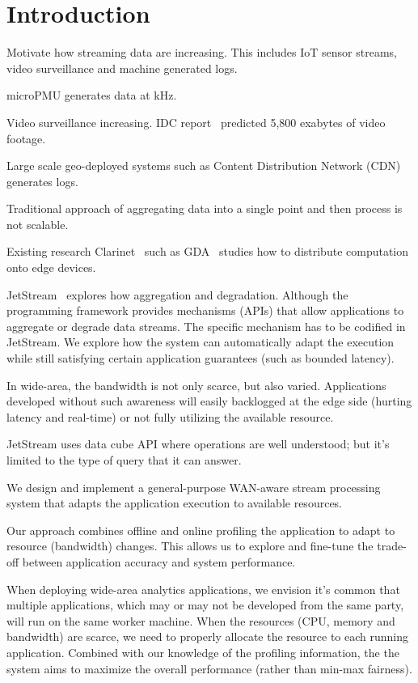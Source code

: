 \section{Introduction}
\label{sec:introduction}

Motivate how streaming data are increasing. This includes IoT sensor streams,
video surveillance and machine generated logs.

microPMU generates data at kHz.

Video surveillance increasing. IDC report~\cite{gantz2012digital} predicted
5,800 exabytes of video footage.

Large scale geo-deployed systems such as Content Distribution Network (CDN)
generates logs.

Traditional approach of aggregating data into a single point and then process is
not scalable.

Existing research Clarinet~\cite{viswanathan2016clarinet} such as
GDA~\cite{pu2015low} studies how to distribute computation onto edge devices.

JetStream~\cite{rabkin2014aggregation} explores how aggregation and degradation.
Although the programming framework provides mechanisms (APIs) that allow
applications to aggregate or degrade data streams. The specific mechanism has to
be codified in JetStream. We explore how the system can automatically adapt the
execution while still satisfying certain application guarantees (such as bounded
latency).

In wide-area, the bandwidth is not only scarce, but also varied. Applications
developed without such awareness will easily backlogged at the edge side
(hurting latency and real-time) or not fully utilizing the available resource.

JetStream uses data cube API where operations are well understood; but it's
limited to the type of query that it can answer.

We design and implement a general-purpose WAN-aware stream processing system
that adapts the application execution to available resources.

Our approach combines offline and online profiling the application to adapt to
resource (bandwidth) changes. This allows us to explore and fine-tune the
trade-off between application accuracy and system performance.

When deploying wide-area analytics applications, we envision it's common that
multiple applications, which may or may not be developed from the same party,
will run on the same worker machine. When the resources (CPU, memory and
bandwidth) are scarce, we need to properly allocate the resource to each running
application. Combined with our knowledge of the profiling information, the the
system aims to maximize the overall performance (rather than min-max fairness).

